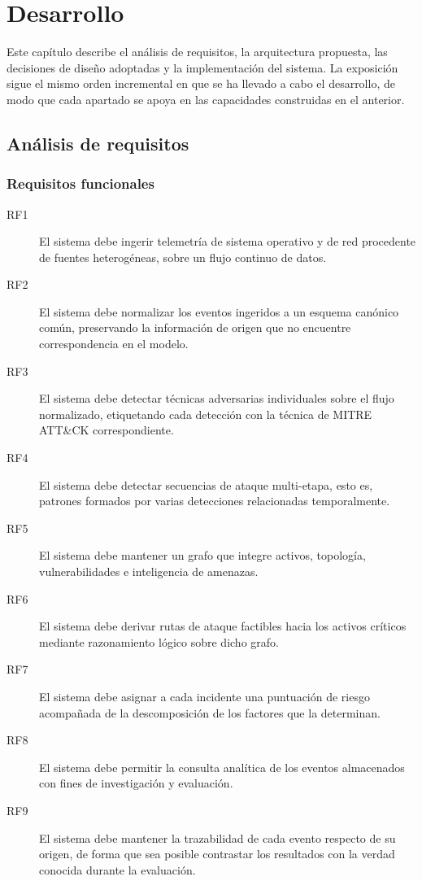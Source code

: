 \chapter{Desarrollo}
\label{cap:desarrollo}

Este capítulo describe el análisis de requisitos, la arquitectura propuesta, las decisiones
de diseño adoptadas y la implementación del sistema. La exposición sigue el mismo orden
incremental en que se ha llevado a cabo el desarrollo, de modo que cada apartado se apoya en
las capacidades construidas en el anterior.

\section{Análisis de requisitos}

\subsection{Requisitos funcionales}

\begin{description}
    \item[RF1] El sistema debe ingerir telemetría de sistema operativo y de red procedente de
    fuentes heterogéneas, sobre un flujo continuo de datos.
    \item[RF2] El sistema debe normalizar los eventos ingeridos a un esquema canónico común,
    preservando la información de origen que no encuentre correspondencia en el modelo.
    \item[RF3] El sistema debe detectar técnicas adversarias individuales sobre el flujo
    normalizado, etiquetando cada detección con la técnica de MITRE ATT\&CK correspondiente.
    \item[RF4] El sistema debe detectar secuencias de ataque multi-etapa, esto es, patrones
    formados por varias detecciones relacionadas temporalmente.
    \item[RF5] El sistema debe mantener un grafo que integre activos, topología,
    vulnerabilidades e inteligencia de amenazas.
    \item[RF6] El sistema debe derivar rutas de ataque factibles hacia los activos críticos
    mediante razonamiento lógico sobre dicho grafo.
    \item[RF7] El sistema debe asignar a cada incidente una puntuación de riesgo acompañada
    de la descomposición de los factores que la determinan.
    \item[RF8] El sistema debe permitir la consulta analítica de los eventos almacenados con
    fines de investigación y evaluación.
    \item[RF9] El sistema debe mantener la trazabilidad de cada evento respecto de su origen,
    de forma que sea posible contrastar los resultados con la verdad conocida durante la
    evaluación.
\end{description}

